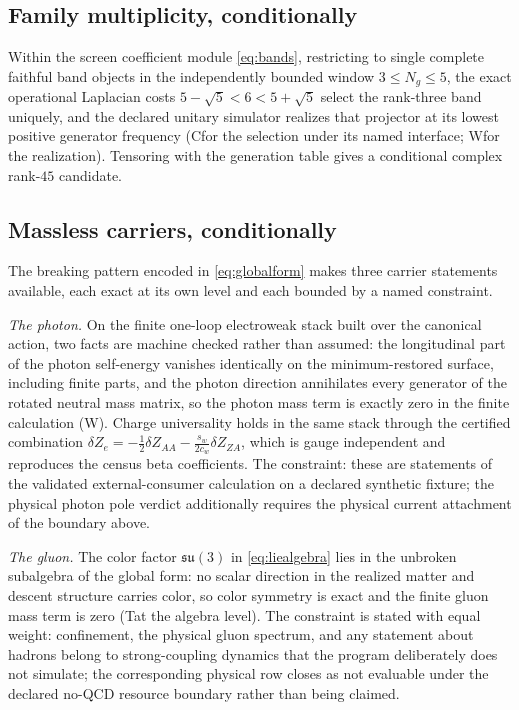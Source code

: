 \documentclass[11pt]{article}
\theoremstyle{remark}
\newcommand{\evT}{\textsf{T}}   %
\newcommand{\evW}{\textsf{W}}   %
\newcommand{\evC}{\textsf{C}}   %
\begin{document}
\subsection{Family multiplicity, conditionally}

Within the screen coefficient module \eqref{eq:bands}, restricting to single
complete faithful band objects in the independently bounded window
$3\le N_g\le 5$, the exact operational Laplacian costs
$5-\sqrt5<6<5+\sqrt5$ select the rank-three band uniquely, and the declared
unitary simulator realizes that projector at its lowest positive generator
frequency (\evC for the selection under its named interface; \evW for the
realization). Tensoring with the generation table gives a conditional
complex rank-$45$ candidate.

\subsection{Massless carriers, conditionally}
\label{sec:massless}

The breaking pattern encoded in \eqref{eq:globalform} makes three carrier
statements available, each exact at its own level and each bounded by a
named constraint.

\emph{The photon.} On the finite one-loop electroweak stack built over the
canonical action, two facts are machine checked rather than assumed: the
longitudinal part of the photon self-energy vanishes identically on the
minimum-restored surface, including finite parts, and the photon direction
annihilates every generator of the rotated neutral mass matrix, so the
photon mass term is exactly zero in the finite calculation (\evW). Charge
universality holds in the same stack through the certified combination
$\delta Z_{e}=-\tfrac12\delta Z_{AA}-\tfrac{s_w}{2c_w}\delta Z_{ZA}$, which
is gauge independent and reproduces the census beta coefficients. The
constraint: these are statements of the validated external-consumer
calculation on a declared synthetic fixture; the physical photon pole verdict
additionally requires the physical current attachment of the boundary above.

\emph{The gluon.} The color factor $\mathfrak{su}(3)$ in
\eqref{eq:liealgebra} lies in the unbroken subalgebra of the global form:
no scalar direction in the realized matter and descent structure carries
color, so color symmetry is exact and the finite gluon mass term is zero
(\evT at the algebra level). The constraint is stated with equal weight:
confinement, the physical gluon spectrum, and any statement about hadrons
belong to strong-coupling dynamics that the program deliberately does not
simulate; the corresponding physical row closes as not evaluable under the
declared no-QCD resource boundary rather than being claimed.
\end{document}
